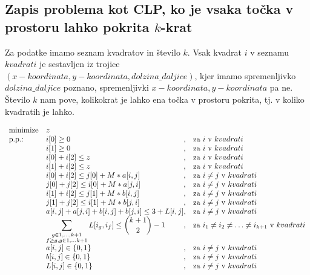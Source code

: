 \documentclass[a4paper, 11pt]{article}
\begin{document}
\subsection{Zapis problema kot CLP, ko je vsaka točka v prostoru lahko pokrita $k$-krat}
Za podatke imamo seznam kvadratov in število $k$. Vsak kvadrat $i$ v seznamu $kvadrati$ je sestavljen
iz trojice $(x-koordinata,y-koordinata,dolzina\_daljice)$, kjer imamo spremenljivko $dolzina\_daljice$
poznano, spremenljivki $x-koordinata,y-koordinata$ pa ne. Število $k$ nam pove, kolikokrat je
lahko ena točka v prostoru pokrita, tj. v koliko kvadratih je lahko.

\begin{equation*}
    \begin{array}{ll@{}ll}
    \text{minimize}  & z &\\
    \text{p.p.:}& i[0] \geq 0 & ,  & \text{za $i$ v $kvadrati$}\\
                & i[1] \geq 0 & ,  & \text{za $i$ v $kvadrati$}\\
                & i[0] +i[2] \leq z & ,  & \text{za $i$ v $kvadrati$}\\
                & i[1]  + i[2] \leq z & ,  & \text{za $i$ v $kvadrati$}\\
                & i[0] + i[2] \leq j[0] + M * a[i,j]& , &\text{za $i \neq j $ v $kvadrati$} \\
                & j[0] + j[2] \leq i[0] + M * a[j,i]& , &\text{za $i \neq j $ v $kvadrati$} \\
                & i[1] + i[2] \leq j[1] + M * b[i,j]& , &\text{za $i \neq j $ v $kvadrati$} \\
                & j[1] + j[2] \leq i[1] + M * b[j,i]& , &\text{za $i \neq j $ v $kvadrati$} \\
                & a[i, j] + a[j, i] + b[i, j] + b[j, i] \leq 3 + L[i,j]& , &\text{za $i \neq j $ v $kvadrati$} \\
                & \displaystyle\sum_{\substack{g \in {1,\dots , k+1}\\ f \ge g, g\in {1, \dots k+1}}} L[i_g,i_f] \leq {k+1 \choose 2} -1& , &\text{za $i_1 \neq i_2\neq \dots \neq i_{k+1} $ v $kvadrati$} \\ 
                & a[i,j] \in \{0,1\} & , &\text{za $i \neq j $ v $kvadrati$} \\
                & b[i,j] \in \{0,1\} & , &\text{za $i \neq j $ v $kvadrati$} \\
                & L[i,j] \in \{0,1\} & , &\text{za $i \neq j $ v $kvadrati$}
    \end{array}
    \end{equation*}
\end{document}
